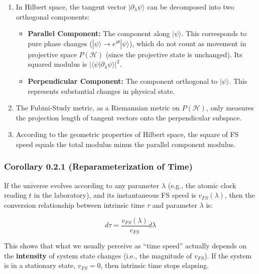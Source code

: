 \begin{enumerate}
\item In Hilbert space, the tangent vector \textbf{$|\partial_{\lambda}\psi\rangle$} can be decomposed into two orthogonal components:

   \begin{itemize}
   \item \textbf{Parallel Component:} The component along \textbf{$|\psi\rangle$}. This corresponds to pure phase changes (\textbf{$|\psi\rangle \to e^{i\theta}|\psi\rangle$}), which do not count as movement in projective space \textbf{$P(\mathcal{H})$} (since the projective state is unchanged). Its squared modulus is \textbf{$|\langle \psi | \partial_{\lambda}\psi \rangle|^2$}.

   \item \textbf{Perpendicular Component:} The component orthogonal to \textbf{$|\psi\rangle$}. This represents substantial changes in physical state.
   \end{itemize}

\item The Fubini-Study metric, as a Riemannian metric on \textbf{$P(\mathcal{H})$}, only measures the projection length of tangent vectors onto the perpendicular subspace.

\item According to the geometric properties of Hilbert space, the square of FS speed equals the total modulus minus the parallel component modulus.
\end{enumerate}

\subsubsection{Corollary 0.2.1 (Reparameterization of Time)}

If the universe evolves according to any parameter \textbf{$\lambda$} (e.g., the atomic clock reading \textbf{$t$} in the laboratory), and its instantaneous FS speed is \textbf{$v_{FS}(\lambda)$}, then the conversion relationship between intrinsic time \textbf{$\tau$} and parameter \textbf{$\lambda$} is:

$$d\tau = \frac{v_{FS}(\lambda)}{c_{FS}} d\lambda$$

This shows that what we usually perceive as ``time speed'' actually depends on the \textbf{intensity} of system state changes (i.e., the magnitude of \textbf{$v_{FS}$}). If the system is in a stationary state, \textbf{$v_{FS}=0$}, then intrinsic time stops elapsing.

